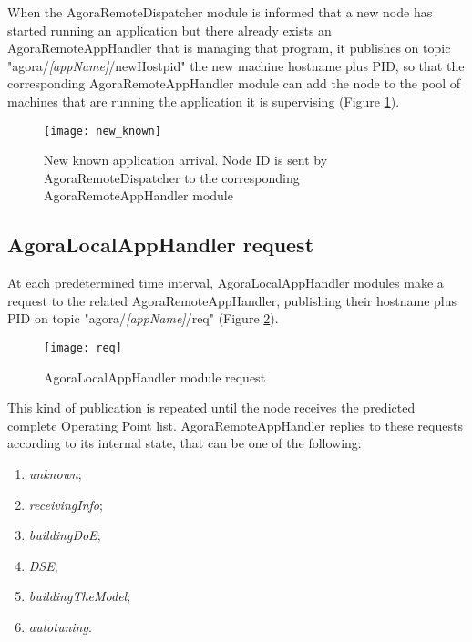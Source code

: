 When the AgoraRemoteDispatcher module is informed that a new node has started running an application but there already exists an AgoraRemoteAppHandler that is managing that program, it publishes on topic "agora\slash{}\textit{[app\-Name]}\slash{}newHostpid" the new machine hostname plus PID, so that the corresponding Agora\-Remote\-App\-Handler module can add the node to the pool of machines that are running the application it is supervising (Figure \ref{fig::knownApp}).

\begin{figure}[ht]

    \centering
    \texttt{[image: new\_known]}
    \caption[New known application arrival]{New known application arrival. Node ID is sent by AgoraRemoteDispatcher to the corresponding AgoraRemoteAppHandler module}

    \label{fig::knownApp}
    
\end{figure}





\subsection{AgoraLocalAppHandler request}\label{clientReq}

At each predetermined time interval, AgoraLocalAppHandler modules make a request to the related AgoraRemoteAppHandler, publishing their hostname plus PID on topic "agora/\textit{[appName]}/req" (Figure \ref{fig::localReq}).

\begin{figure}[hb]

    \centering
    \texttt{[image: req]}
    \caption{AgoraLocalAppHandler module request}

    \label{fig::localReq}
    
\end{figure}

This kind of publication is repeated until the node receives the predicted complete Operating Point list. AgoraRemoteAppHandler replies to these requests according to its internal state, that can be one of the following:

\begin{enumerate}

    \item \textit{unknown};

    \item \textit{receivingInfo};

    \item \textit{buildingDoE};

    \item \textit{DSE};

    \item \textit{buildingTheModel};

    \item \textit{autotuning}.

\end{enumerate}


